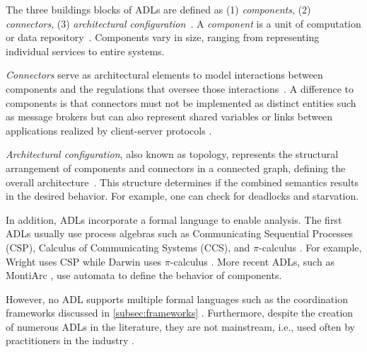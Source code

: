 \documentclass[runningheads]{llncs}
\begin{document}
The three buildings blocks of ADLs are defined as (1) \textit{components}, (2) \textit{connectors}, (3) \textit{architectural configuration}~\cite{medvidovicClassificationComparisonFramework2000,medvidovicFrameworkClassifyingComparing1997}.
A \textit{component} is a unit of computation or data repository~\cite{medvidovicClassificationComparisonFramework2000}.
Components vary in size, ranging from representing individual services to entire systems.

\textit{Connectors} serve as architectural elements to model interactions between components and the regulations that oversee those interactions~\cite{medvidovicClassificationComparisonFramework2000}.
A difference to components is that connectors must not be implemented as distinct entities such as message brokers but can also represent shared variables or links between applications realized by client-server protocols \cite{medvidovicClassificationComparisonFramework2000}.

\textit{Architectural configuration}, also known as topology, represents the structural arrangement of components and connectors in a connected graph, defining the overall architecture~\cite{medvidovicClassificationComparisonFramework2000}.
This structure determines if the combined semantics results in the desired behavior.
For example, one can check for deadlocks and starvation.

In addition, ADLs incorporate a formal language to enable analysis.
The first ADLs usually use process algebras such as Communicating Sequential Processes (CSP), Calculus of Communicating Systems (CCS), and $\pi$-calculus \cite{ozkayaAreWeThere2013}.
For example, Wright uses CSP \cite{allenFormalBasisArchitectural1997} while Darwin uses $\pi$-calculus \cite{mageeSpecifyingDistributedSoftware1995}.
More recent ADLs, such as MontiArc \cite{haberMontiArcArchitecturalModeling2014}, use automata to define the behavior of components.

However, no ADL supports multiple formal languages such as the coordination frameworks discussed in \autoref{subsec:frameworks} \cite{medvidovicClassificationComparisonFramework2000}.
Furthermore, despite the creation of numerous ADLs in the literature, they are not mainstream, i.e., used often by practitioners in the industry \cite{clementsSurveyArchitectureDescription1996,woodsArchitectureDescriptionLanguages2005,pandeyArchitecturalDescriptionLanguages2010,ozkayaAreWeThere2013,medvidovicMovingArchitecturalDescription2006}.
\end{document}
